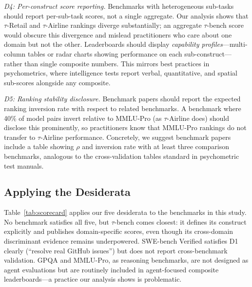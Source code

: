 \documentclass[11pt]{article}
\begin{document}
\textit{D4: Per-construct score reporting.} Benchmarks with heterogeneous sub-tasks should report per-sub-task scores, not a single aggregate. Our analysis shows that $\tau$-Retail and $\tau$-Airline rankings diverge substantially; an aggregate $\tau$-bench score would obscure this divergence and mislead practitioners who care about one domain but not the other. Leaderboards should display \emph{capability profiles}---multi-column tables or radar charts showing performance on each sub-construct---rather than single composite numbers. This mirrors best practices in psychometrics, where intelligence tests report verbal, quantitative, and spatial sub-scores alongside any composite.

\textit{D5: Ranking stability disclosure.} Benchmark papers should report the expected ranking inversion rate with respect to related benchmarks. A benchmark where 40\% of model pairs invert relative to MMLU-Pro (as $\tau$-Airline does) should disclose this prominently, so practitioners know that MMLU-Pro rankings do not transfer to $\tau$-Airline performance. Concretely, we suggest benchmark papers include a table showing $\rho$ and inversion rate with at least three comparison benchmarks, analogous to the cross-validation tables standard in psychometric test manuals.

\subsection{Applying the Desiderata}
Table~\ref{tab:scorecard} applies our five desiderata to the benchmarks in this study. No benchmark satisfies all five, but $\tau$-bench comes closest: it defines its construct explicitly and publishes domain-specific scores, even though its cross-domain discriminant evidence remains underpowered. SWE-bench Verified satisfies D1 clearly (``resolve real GitHub issues'') but does not report cross-benchmark validation. GPQA and MMLU-Pro, as reasoning benchmarks, are not designed as agent evaluations but are routinely included in agent-focused composite leaderboards---a practice our analysis shows is problematic.
\end{document}
